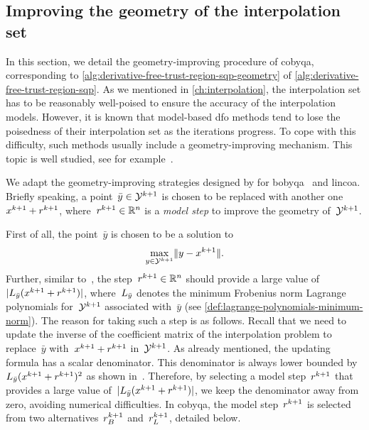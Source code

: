 \subsection{Improving the geometry of the interpolation set}
\label{subsec:geometry-improvement}

In this section, we detail the geometry-improving procedure of \gls{cobyqa}, corresponding to \cref{alg:derivative-free-trust-region-sqp-geometry} of \cref{alg:derivative-free-trust-region-sqp}.
As we mentioned in \cref{ch:interpolation}, the interpolation set has to be reasonably well-poised to ensure the accuracy of the interpolation models.
However, it is known that model-based \gls{dfo} methods tend to lose the poisedness of their interpolation set as the iterations progress.
To cope with this difficulty, such methods usually include a geometry-improving mechanism.
This topic is well studied, see for example~\cite{Conn_Scheinberg_Vicente_2008a,Conn_Scheinberg_Vicente_2008b,Fasano_Morales_Nocedal_2009,Scheinberg_Toint_2010}.

We adapt the geometry-improving strategies designed by \citeauthor{Powell_2009} for \gls{bobyqa}~\cite{Powell_2009} and \gls{lincoa}.
Briefly speaking, a point~$\bar{y} \in \xpt[k + 1]$ is chosen to be replaced with another one~$\iter[k + 1] + \rstep[k + 1]$, where~$\rstep[k + 1] \in \R^n$ is a \emph{model step} to improve the geometry of~$\xpt[k + 1]$.

First of all, the point~$\bar{y}$ is chosen to be a solution to
\begin{equation}
    \label{eq:choice-point-geometry-improving}
    \max_{y \in \xpt[k + 1]} \norm{y - \iter[k + 1]}.
\end{equation}
Further, similar to~\cite[Eq.~(6.6)]{Powell_2006}, the step~$\rstep[k + 1] \in \R^n$ should provide a large value of~$\abs{\lagp[\bar{y}](\iter[k + 1] + \rstep[k + 1])}$, where~$\lagp[\bar{y}]$ denotes the minimum Frobenius norm Lagrange polynomials for~$\xpt[k + 1]$ associated with~$\bar{y}$ (see \cref{def:lagrange-polynomials-minimum-norm}).
The reason for taking such a step is as follows.
Recall that we need to update the inverse of the coefficient matrix of the interpolation problem to replace~$\bar{y}$ with~$\iter[k + 1] + \rstep[k + 1]$ in~$\xpt[k + 1]$.
As already mentioned, the updating formula has a scalar denominator.
This denominator is always lower bounded by~$\lagp[\bar{y}](\iter[k + 1] + \rstep[k + 1])^2$ as shown in~\cite[Eq.~(6.5)]{Powell_2006}.
Therefore, by selecting a model step~$\rstep[k + 1]$ that provides a large value of~$\abs{\lagp[\bar{y}](\iter[k + 1] + \rstep[k + 1])}$, we keep the denominator away from zero, avoiding numerical difficulties.
In \gls{cobyqa}, the model step~$\rstep[k + 1]$ is selected from two alternatives~$\rstep[k + 1]_B$ and~$\rstep[k + 1]_L$, detailed below.

